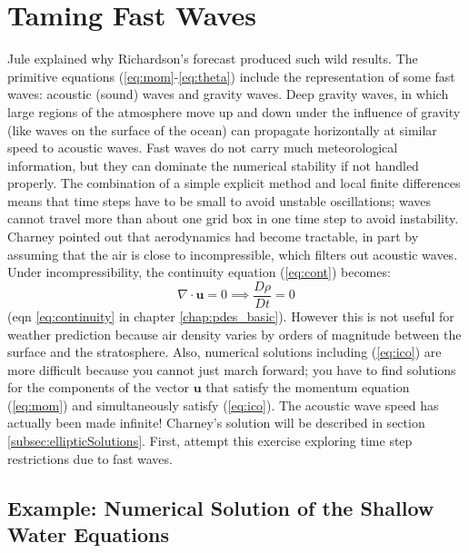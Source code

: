 \section{Taming Fast Waves}

Jule \citet{Char48} explained why Richardson's forecast produced
such wild results. The primitive equations (\ref{eq:mom}-\ref{eq:theta})
include the representation of some fast waves: acoustic (sound) waves
and gravity waves. Deep gravity waves, in which large regions of the
atmosphere move up and down under the influence of gravity (like waves
on the surface of the ocean) can propagate horizontally at similar
speed to acoustic waves. Fast waves do not carry much meteorological
information, but they can dominate the numerical stability if not
handled properly. The combination of a simple explicit method and
local finite differences means that time steps have to be small to
avoid unstable oscillations; waves cannot travel more than about one
grid box in one time step to avoid instability. Charney pointed out
that aerodynamics had become tractable, in part by assuming that the
air is close to incompressible, which filters out acoustic waves.
Under incompressibility, the continuity equation (\ref{eq:cont})
becomes:
\begin{equation}
\nabla\cdot\mathbf{u}=0\implies\frac{D\rho}{Dt}=0\label{eq:ico}
\end{equation}
(eqn \ref{eq:continuity} in chapter \ref{chap:pdes_basic}). However
this is not useful for weather prediction because air density varies
by orders of magnitude between the surface and the stratosphere. Also,
numerical solutions including (\ref{eq:ico}) are more difficult because
you cannot just march forward; you have to find solutions for the
components of the vector $\mathbf{u}$ that satisfy the momentum equation
(\ref{eq:mom}) and simultaneously satisfy (\ref{eq:ico}). The acoustic
wave speed has actually been made infinite! Charney's solution will
be described in section \ref{subsec:ellipticSolutions}. First, attempt
this exercise exploring time step restrictions due to fast waves.

\subsection{Example: Numerical Solution of the Shallow Water Equations}\label{subsec:solveSW}

